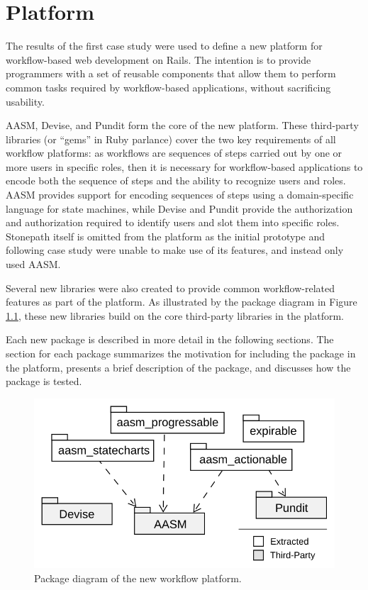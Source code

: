 \documentclass[document.tex]{subfiles}
\begin{document}
\chapter{Platform}
\label {ch:platform}

The results of the first case study were used to define a new platform for workflow-based web development on Rails. The intention is to provide programmers with a set of reusable components that allow them to perform common tasks required by workflow-based applications, without sacrificing usability.

AASM, Devise, and Pundit form the core of the new platform. These third-party libraries (or ``gems'' in Ruby parlance) cover the two key requirements of all workflow platforms: as workflows are sequences of steps carried out by one or more users in specific roles, then it is necessary for workflow-based applications to encode both the sequence of steps and the ability to recognize users and roles. AASM provides support for encoding sequences of steps using a domain-specific language for state machines, while Devise and Pundit provide the authorization and authorization required to identify users and slot them into specific roles. Stonepath itself is omitted from the platform as the initial prototype and following case study were unable to make use of its features, and instead only used AASM.

Several new libraries were also created to provide common workflow-related features as part of the platform. As illustrated by the package diagram in Figure \ref{fig:platform-package-diagram}, these new libraries build on the core third-party libraries in the platform.

Each new package is described in more detail in the following sections. The section for each package summarizes the motivation for including the package in the platform, presents a brief description of the package, and discusses how the package is tested.

\begin{figure}[!ht]
\centering \includegraphics[width=4.5in]{./img/platform/platform-package-diagram}
\caption{Package diagram of the new workflow platform.}
\label{fig:platform-package-diagram}
\end{figure}
\end{document}
